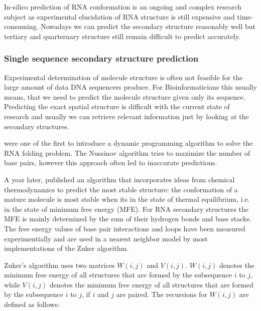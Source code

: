 In-silico prediction of RNA conformation is an ongoing and complex research subject as experimental elucidation of RNA structure is still expensive and time-consuming. Nowadays we can predict the secondary structure reasonably well but tertiary and quarternary structure still remain difficult to predict accurately.

\subsubsection{Single sequence secondary structure prediction}
Experimental determination of molecule structure is often not feasible for the large amount of data DNA sequencers produce. For Bioinformaticians
this usually means, that we need to predict the molecule structure given only its sequence. Predicting the exact spatial structure is difficult with the current state of research and usually we can retrieve relevant information just by looking at the secondary structures. 

\citeauthor{pmid6163133} were one of the first to introduce a dynamic programming algorithm to solve the RNA folding problem. The Nussinov algorithm tries to maximize the number of base pairs, however this approach often led to inaccurate predictions.   

A year later, \citeauthor{pmid6163133} published an algorithm that incorporates ideas from chemical thermodynamics to predict the most stable structure: the conformation of a mature molecule is most stable when its in the state of thermal equilibrium, i.e. in the state of minimum free energy (MFE). For RNA secondary structures the MFE is mainly determined by the sum of their hydrogen bonds and base stacks. The free energy values of base pair interactions  and loops have been measured experimentially and are used in a nearest neighbor model by most implementations of the Zuker algorithm.  

Zuker's algorithm uses two matrices $W(i,j)$ and $V(i,j)$. $W(i,j)$ denotes the minimum free energy of all structures that are formed by the subsequence $i$ to $j$, while $V(i,j)$ denotes the minimum free energy of all structures that are formed by the subsequence $i$ to $j$, if $i$ and $j$ are paired. The recursions for $W(i,j)$ are defined as follows:

